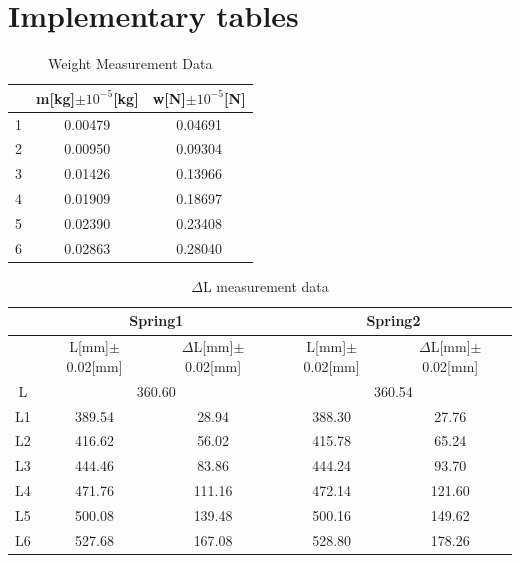 \documentclass[12pt,a4paper]{article}
\begin{document}
\section{Implementary tables}
\begin{table}[H]
    \centering
    \begin{tabular}{|c|c|c|}
    \hline
      & m{[}kg{]}$\pm10^{-5}${[}kg{]} & w{[}N{]}$\pm10^{-5}${[}N{]} \\ \hline
    1 & 0.00479 & 0.04691         \\ \hline
    2 & 0.00950 & 0.09304         \\ \hline
    3 & 0.01426 & 0.13966         \\ \hline
    4 & 0.01909 & 0.18697         \\ \hline
    5 & 0.02390 & 0.23408         \\ \hline
    6 & 0.02863 & 0.28040         \\ \hline
    \end{tabular}
    \caption{Weight Measurement Data}
    \label{weight}
\end{table}

\begin{table}[H]
    \centering
    \begin{tabular}{|c|c|c|c|c|}
    \hline
       & \multicolumn{2}{c|}{Spring1}         & \multicolumn{2}{c|}{Spring2}         \\ \hline
       & L{[}mm{]}$\pm$0.02{[}mm{]} & $\Delta$L{[}mm{]}$\pm$0.02{[}mm{]} & L{[}mm{]}$\pm$0.02{[}mm{]} & $\Delta$L{[}mm{]}$\pm$0.02{[}mm{]} \\ \hline
    L  & \multicolumn{2}{c|}{360.60}& \multicolumn{2}{c|}{360.54}\\ \hline
    L1 & 389.54      & 28.94       & 388.30       & 27.76       \\ \hline
    L2 & 416.62      & 56.02       & 415.78      & 65.24       \\ \hline
    L3 & 444.46      & 83.86       & 444.24      & 93.70        \\ \hline
    L4 & 471.76      & 111.16      & 472.14      & 121.60       \\ \hline
    L5 & 500.08      & 139.48      & 500.16      & 149.62      \\ \hline
    L6 & 527.68      & 167.08      & 528.80       & 178.26      \\ \hline
    \end{tabular}
    \caption{$\Delta$L measurement data}
    \label{deltal}
 \end{table}
\end{document}
